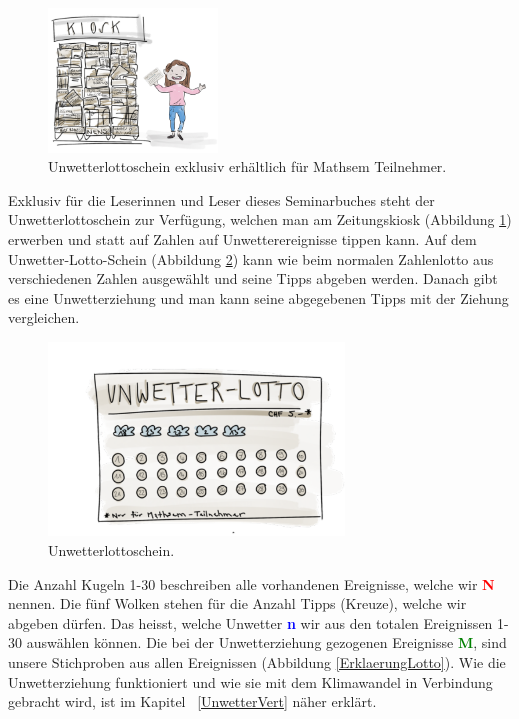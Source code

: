 \begin{refsection}
\begin{figure}
\centering
\includegraphics[width=0.4\textwidth]{extrem/Kiosk.pdf}
\caption{Unwetterlottoschein exklusiv erhältlich für Mathsem Teilnehmer.}
\label{Kiosk}
\end{figure}

Exklusiv für die Leserinnen und Leser dieses Seminarbuches steht der Unwetterlottoschein zur Verfügung, welchen man am Zeitungskiosk (Abbildung \ref{Kiosk}) erwerben und statt auf Zahlen auf Unwetterereignisse tippen kann. Auf dem Unwetter-Lotto-Schein (Abbildung \ref{Lottoschein}) kann wie beim normalen Zahlenlotto aus verschiedenen Zahlen ausgewählt und seine Tipps abgeben werden. Danach gibt es eine Unwetterziehung und man kann seine abgegebenen Tipps mit der Ziehung vergleichen.

\begin{figure}
\centering
\includegraphics[width=0.7\textwidth]{extrem/Lottoschein.pdf}
\caption{Unwetterlottoschein.}
\label{Lottoschein}
\end{figure}

Die Anzahl Kugeln 1-30 beschreiben alle vorhandenen Ereignisse, welche wir \textcolor{red}{\textbf{N}} nennen. Die fünf Wolken stehen für die Anzahl Tipps (Kreuze), welche wir abgeben dürfen. Das heisst, welche Unwetter \textcolor{blue}{\textbf{n}} wir aus den totalen Ereignissen 1-30 auswählen können. Die bei der Unwetterziehung gezogenen Ereignisse \textcolor{green}{\textbf{M}}, sind unsere Stichproben aus allen Ereignissen (Abbildung \ref{ErklaerungLotto}). Wie die Unwetterziehung funktioniert und wie sie mit dem Klimawandel in Verbindung gebracht wird, ist im Kapitel ~\ref{UnwetterVert}  näher erklärt.


\end{refsection}
